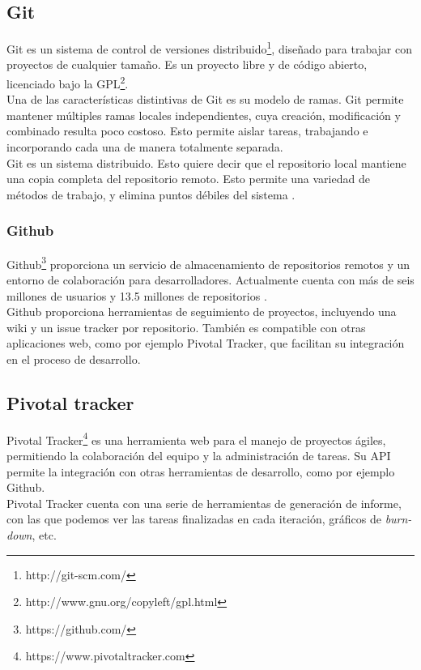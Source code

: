 \subsection{Git}
Git es un sistema de control de versiones distribuido\footnote{http://git-scm.com/}, diseñado para trabajar con proyectos de cualquier tamaño.
Es un proyecto libre y de código abierto, licenciado bajo la GPL\footnote{http://www.gnu.org/copyleft/gpl.html}.
\\
Una de las características distintivas de Git es su modelo de ramas.
Git permite mantener múltiples ramas locales independientes, cuya creación, modificación y combinado resulta poco costoso.
Esto permite aislar tareas, trabajando e incorporando cada una de manera totalmente separada.
\\
Git es un sistema distribuido.
Esto quiere decir que el repositorio local mantiene una copia completa del repositorio remoto.
Esto permite una variedad de métodos de trabajo, y elimina puntos débiles del sistema \cite{website:git}.

\subsubsection{Github}
Github\footnote{https://github.com/} proporciona un servicio de almacenamiento de repositorios remotos y un entorno de colaboración para desarrolladores.
Actualmente cuenta con más de seis millones de usuarios y 13.5 millones de repositorios \cite{website:github}.
\\
Github proporciona herramientas de seguimiento de proyectos, incluyendo una wiki y un issue tracker por repositorio.
También es compatible con otras aplicaciones web, como por ejemplo Pivotal Tracker, que facilitan su integración en el proceso de desarrollo.

\subsection{Pivotal tracker}
Pivotal Tracker\footnote{https://www.pivotaltracker.com} es una herramienta web para el manejo de proyectos ágiles, permitiendo la colaboración del equipo y la administración de tareas.
Su API permite la integración con otras herramientas de desarrollo, como por ejemplo Github.
\\
Pivotal Tracker cuenta con una serie de herramientas de generación de informe, con las que podemos ver las tareas finalizadas en cada iteración, gráficos de \emph{burn-down}, etc.

